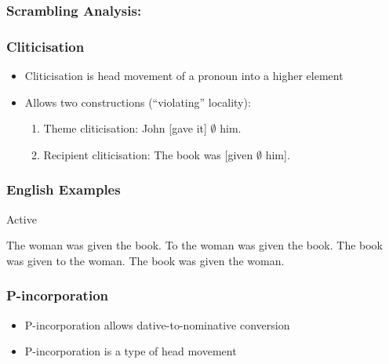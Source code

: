 \documentclass{beamer}
\begin{document}
\begin{frame}
	\frametitle{Scrambling Analysis:}
	\begin{exe}
		\ex
{}
	\end{exe}
\end{frame}

\begin{frame}
	\frametitle{Cliticisation}
	\begin{itemize}
		\item Cliticisation is head movement of a pronoun into a higher element
		\item Allows two constructions (``violating'' locality):
		\begin{enumerate}
			\item Theme cliticisation: John [gave it] $\emptyset$ him.
			\item Recipient cliticisation: The book was [given $\emptyset$ him].
		\end{enumerate}
	\end{itemize}
\end{frame}

\begin{frame}
	\frametitle{English Examples}
\begin{exe}
	\ex Active
	\begin{xlist}
		\ex The woman was given the book.
		\ex To the woman was given the book.
		\ex The book was given to the woman.
		\ex The book was given the woman.
	\end{xlist}
\end{exe}
\end{frame}

\begin{frame}
	\frametitle{P-incorporation}
	\begin{itemize}
		\item P-incorporation allows dative-to-nominative conversion \citep{Alexiadou.2014}
		\item P-incorporation is a type of head movement
	\end{itemize}
 \end{frame}
\end{document}
